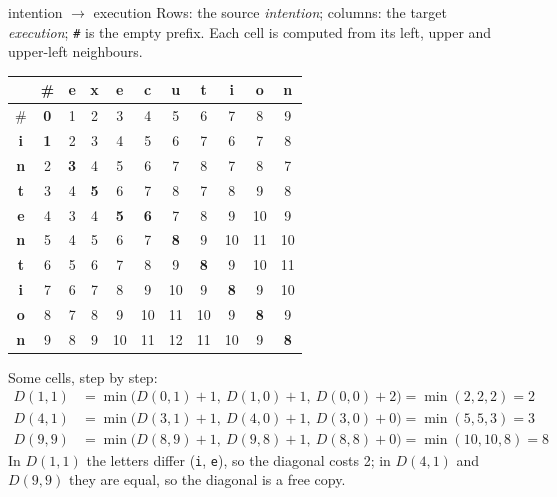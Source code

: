 \begin{nbexample}{intention $\to$ execution}
Rows: the source \emph{intention}; columns: the target \emph{execution}; \texttt{\#} is
the empty prefix. Each cell is computed from its left, upper and upper-left neighbours.
\begin{center}
\small
\begin{tabular}{@{}c|cccccccccc@{}}
 & \# & \textbf{e} & \textbf{x} & \textbf{e} & \textbf{c} & \textbf{u} & \textbf{t} & \textbf{i} & \textbf{o} & \textbf{n} \\ \hline
\# & \cellcolor{nbteal!25}\textbf{0} & 1 & 2 & 3 & 4 & 5 & 6 & 7 & 8 & 9 \\
\textbf{i} & \cellcolor{nbteal!25}\textbf{1} & 2 & 3 & 4 & 5 & 6 & 7 & 6 & 7 & 8 \\
\textbf{n} & 2 & \cellcolor{nbteal!25}\textbf{3} & 4 & 5 & 6 & 7 & 8 & 7 & 8 & 7 \\
\textbf{t} & 3 & 4 & \cellcolor{nbteal!25}\textbf{5} & 6 & 7 & 8 & 7 & 8 & 9 & 8 \\
\textbf{e} & 4 & 3 & 4 & \cellcolor{nbteal!25}\textbf{5} & \cellcolor{nbteal!25}\textbf{6} & 7 & 8 & 9 & 10 & 9 \\
\textbf{n} & 5 & 4 & 5 & 6 & 7 & \cellcolor{nbteal!25}\textbf{8} & 9 & 10 & 11 & 10 \\
\textbf{t} & 6 & 5 & 6 & 7 & 8 & 9 & \cellcolor{nbteal!25}\textbf{8} & 9 & 10 & 11 \\
\textbf{i} & 7 & 6 & 7 & 8 & 9 & 10 & 9 & \cellcolor{nbteal!25}\textbf{8} & 9 & 10 \\
\textbf{o} & 8 & 7 & 8 & 9 & 10 & 11 & 10 & 9 & \cellcolor{nbteal!25}\textbf{8} & 9 \\
\textbf{n} & 9 & 8 & 9 & 10 & 11 & 12 & 11 & 10 & 9 & \cellcolor{nbteal!25}\textbf{8} \\
\end{tabular}
\end{center}
Some cells, step by step:
\begin{align*}
  D(1,1) &= \min\bigl(D(0,1)+1,\ D(1,0)+1,\ D(0,0)+2\bigr) = \min(2, 2, 2) = 2\\
  D(4,1) &= \min\bigl(D(3,1)+1,\ D(4,0)+1,\ D(3,0)+0\bigr) = \min(5, 5, 3) = 3\\
  D(9,9) &= \min\bigl(D(8,9)+1,\ D(9,8)+1,\ D(8,8)+0\bigr) = \min(10, 10, 8) = 8
\end{align*}
In $D(1,1)$ the letters differ (\texttt{i}, \texttt{e}), so the diagonal costs 2; in
$D(4,1)$ and $D(9,9)$ they are equal, so the diagonal is a free copy.
\end{nbexample}

